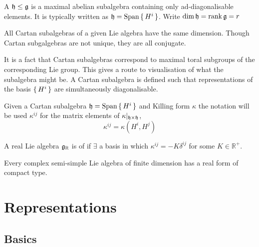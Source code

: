 \documentclass{article}
\begin{document}
\begin{definition}
A  $\mathfrak{h}\leq\mathfrak{g}$ is a maximal abelian subalgebra containing only ad-diagonalisable elements. It is typically written as $\mathfrak{h}=\operatorname{Span}\set{ H^i }$. Write $\dim{\mathfrak{h}}=\operatorname{rank}{\mathfrak{g}}=r$
\end{definition}

\begin{fact}
All Cartan subalgebras of a given Lie algebra have the same dimension. Though Cartan subgalgebras are not unique, they are all conjugate. 
\end{fact}

\begin{idea}
It is a fact that Cartan subalgebras correspond to maximal toral subgroups of the corresponding Lie group. This gives a route to visualisation of what the subalgebra might be. A Cartan subalgebra is defined such that representations of the basis $\set{ H^i }$ are simultaneously diagonalisable. 
\end{idea}

\begin{definition}[$\kappa^{ij}$]
Given a Cartan subalgebra $\mathfrak{h}=\operatorname{Span}\set{ H^i }$ and Killing form $\kappa$ the notation will be used $\kappa^{ij}$ for the matrix elements of $\kappa |_{\mathfrak{h}\times\mathfrak{h}}$,
\[
\kappa^{ij}=\kappa(H^i, H^j)
\]
\end{definition}

\begin{definition}
A real Lie algebra $\mathfrak{g}_\mathbb{R}$ is of  if $\exists$ a basis in which $\kappa^{ij}=-K\delta^{ij}$ for some $K\in\mathbb{R}^{+}$.
\end{definition}

\begin{fact}
Every complex semi-simple Lie algebra of finite dimension has a real form of compact type.
\end{fact}

\section{Representations}

\subsection{Basics}
\end{document}

